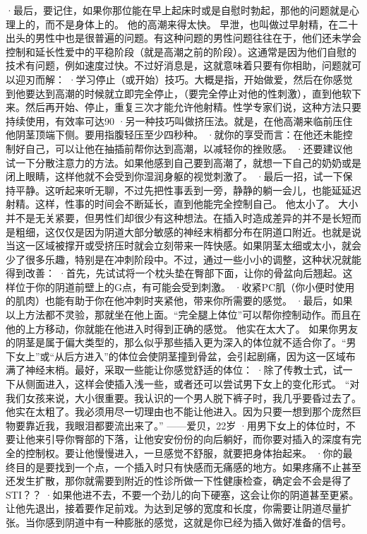 \documentclass[12pt,UTF8,openany]{ctexbook}
\begin{document}
·最后，要记住，如果你那位能在早上起床时或是自慰时勃起，那他的问题就是心理上的，而不是身体上的。
他的高潮来得太快。
早泄，也叫做过早射精，在二十出头的男性中也是很普遍的问题。有这种问题的男性问题往往在于，他们还未学会控制和延长性爱中的平稳阶段（就是高潮之前的阶段）。这通常是因为他们自慰的技术有问题，例如速度过快。不过好消息是，这就意味着只要有你相助，问题就可以迎刃而解：
·学习停止（或开始）技巧。大概是指，开始做爱，然后在你感觉到他要达到高潮的时候就立即完全停止，（要完全停止对他的性刺激），直到他软下来。然后再开始、停止，重复三次才能允许他射精。性学专家们说，这种方法只要持续使用，有效率可达90%
·另一种技巧叫做挤压法。就是，在他高潮来临前压住他阴茎顶端下侧。要用指腹轻压至少四秒种。
·就你的享受而言：在他还未能控制好自己，可以让他在抽插前帮你达到高潮，以减轻你的挫败感。
·还要建议他试一下分散注意力的方法。如果他感到自己要到高潮了，就想一下自己的奶奶或是闭上眼睛，这样他就不会受到你湿润身躯的视觉刺激了。
·最后一招，试一下保持平静。这听起来听无聊，不过先把性事丢到一旁，静静的躺一会儿，也能延延迟射精。这样，性事的时间会不断延长，直到他能完全控制自己。
他太小了。
大小并不是无关紧要，但男性们却很少有这种想法。在插入时造成差异的并不是长短而是粗细，这仅仅是因为阴道大部分敏感的神经末梢都分布在阴道口附近。也就是说当这一区域被撑开或受挤压时就会立刻带来一阵快感。如果阴茎太细或太小，就会少了很多乐趣，特别是在冲刺阶段中。不过，通过一些小小的调整，这种状况就能得到改善：
·首先，先试试将一个枕头垫在臀部下面，让你的骨盆向后翘起。这样位于你的阴道前壁上的G点，有可能会受到刺激。
·收紧PC肌（你小便时使用的肌肉）也能有助于你在他冲刺时夹紧他，带来你所需要的感觉。
·最后，如果以上方法都不灵验，那就坐在他上面。“完全腿上体位”可以帮你控制动作。而且在他的上方移动，你就能在他进入时得到正确的感觉。
他实在太大了。
如果你男友的阴茎是属于偏大类型的，那么似乎那些插入更为深入的体位就不适合你了。“男下女上”或“从后方进入”的体位会使阴茎撞到骨盆，会引起剧痛，因为这一区域布满了神经末梢。最好，采取一些能让你感觉舒适的体位：
·除了传教士式，试一下从侧面进入，这样会使插入浅一些，或者还可以尝试男下女上的变化形式。
“对我们女孩来说，大小很重要。我认识的一个男人脱下裤子时，我几乎要昏过去了。他实在太粗了。我必须用尽一切理由也不能让他进入。因为只要一想到那个庞然巨物要靠近我，我眼泪都要流出来了。”
——爱贝，22岁
·用男下女上的体位时，不要让他来引导你臀部的下落，让他安安份份的向后躺好，而你要对插入的深度有完全的控制权。要让他慢慢进入，一旦感觉不舒服，就要把身体抬起来。
·你的最终目的是要找到一个点，一个插入时只有快感而无痛感的地方。如果疼痛不止甚至还发生扩散，那你就需要到附近的性诊所做一下性健康检查，确定会不会是得了STI？？
·如果他进不去，不要一个劲儿的向下硬塞，这会让你的阴道甚至更紧。让他先退出，接着要作足前戏。为达到足够的宽度和长度，你需要让阴道尽量扩张。当你感到阴道中有一种膨胀的感觉，这就是你已经为插入做好准备的信号。
\end{document}
